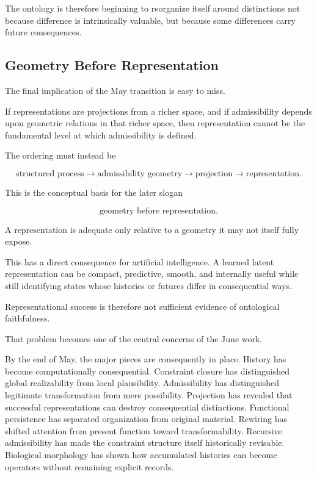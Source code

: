 \documentclass[11pt]{article}
\theoremstyle{remark}
\begin{document}
The ontology is therefore beginning to reorganize itself around distinctions not because difference is intrinsically valuable, but because some differences carry future consequences.

\subsection{Geometry Before Representation}

The final implication of the May transition is easy to miss.

If representations are projections from a richer space, and if admissibility depends upon geometric relations in that richer space, then representation cannot be the fundamental level at which admissibility is defined.

The ordering must instead be

\begin{equation}
\text{structured process}
\longrightarrow
\text{admissibility geometry}
\longrightarrow
\text{projection}
\longrightarrow
\text{representation}.
\end{equation}

This is the conceptual basis for the later slogan

\begin{equation}
\boxed{
\text{geometry before representation}.
}
\end{equation}

A representation is adequate only relative to a geometry it may not itself fully expose.

This has a direct consequence for artificial intelligence. A learned latent representation can be compact, predictive, smooth, and internally useful while still identifying states whose histories or futures differ in consequential ways.

Representational success is therefore not sufficient evidence of ontological faithfulness.

That problem becomes one of the central concerns of the June work.

By the end of May, the major pieces are consequently in place. History has become computationally consequential. Constraint closure has distinguished global realizability from local plausibility. Admissibility has distinguished legitimate transformation from mere possibility. Projection has revealed that successful representations can destroy consequential distinctions. Functional persistence has separated organization from original material. Rewiring has shifted attention from present function toward transformability. Recursive admissibility has made the constraint structure itself historically revisable. Biological morphology has shown how accumulated histories can become operators without remaining explicit records.
\end{document}
